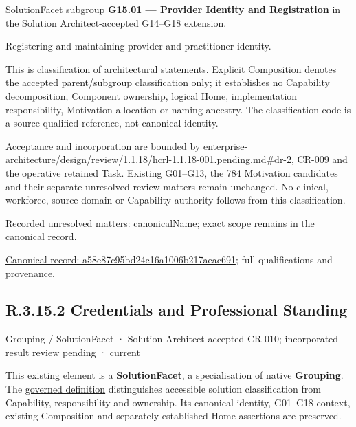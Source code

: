 SolutionFacet subgroup \textbf{G15.01 — Provider Identity and Registration} in the Solution Architect-accepted G14–G18 extension.



Registering and maintaining provider and practitioner identity.



This is classification of architectural statements. Explicit Composition denotes the accepted parent/subgroup classification only; it establishes no Capability decomposition, Component ownership, logical Home, implementation responsibility, Motivation allocation or naming ancestry. The classification code is a source-qualified reference, not canonical identity.



Acceptance and incorporation are bounded by enterprise-architecture/design/review/1.1.18/hcrl-1.1.18-001.pending.md\#dr-2, CR-009 and the operative retained Task. Existing G01–G13, the 784 Motivation candidates and their separate unresolved review matters remain unchanged. No clinical, workforce, source-domain or Capability authority follows from this classification.


{\small Recorded unresolved matters: canonicalName; exact scope remains in the canonical record.}\par
{\footnotesize \href{../../../../../../../continuum/grouping/a58e87c95bd24c16a1006b217aeac691.md}{Canonical record: a58e87c95bd24c16a1006b217aeac691}; full qualifications and provenance.}\par
\subsection*{R.3.15.2 Credentials and Professional Standing}
\label{navigation:R.3.15.2}

\label{element:2ad6333e5858456dba8aefeec71773a5}
{\small Grouping / SolutionFacet · Solution Architect accepted CR-010; incorporated-result review pending · current}\par

This existing element is a \textbf{SolutionFacet}, a specialisation of native
\textbf{Grouping}. The \href{\detokenize{../../../../../../../governance/continuum-representation.md#solutionfacet-classification--1119-candidate}}{governed definition}
distinguishes accessible solution classification from Capability, responsibility
and ownership. Its canonical identity, G01–G18 context, existing Composition
and separately established Home assertions are preserved.



